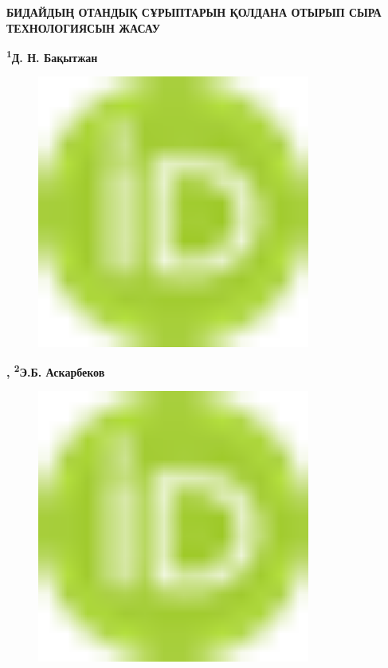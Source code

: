 
{\bfseries БИДАЙДЫҢ ОТАНДЫҚ СҰРЫПТАРЫН ҚОЛДАНА ОТЫРЫП СЫРА ТЕХНОЛОГИЯСЫН
ЖАСАУ}

\hl{}

{\bfseries \textsuperscript{1}Д. Н. Бақытжан}
\begin{figure}[H]
	\centering
	\includegraphics[width=0.8\textwidth]{media/pish3/image1}
	\caption*{}
\end{figure}

{\bfseries , \textsuperscript{2}Э.Б. Аскарбеков}
\begin{figure}[H]
	\centering
	\includegraphics[width=0.8\textwidth]{media/pish3/image1}
	\caption*{}
\end{figure}

